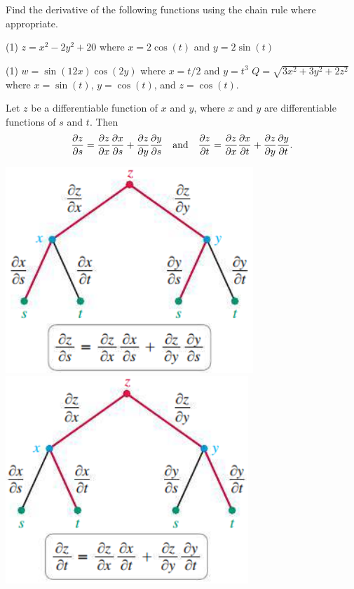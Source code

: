 \documentclass[mathNotesPreamble]{subfiles}
\begin{document}
  \begin{ex*}
    Find the derivative of the following functions using the chain rule where appropriate.
  \end{ex*}
  \begin{tasks}[after-item-skip=\stretch{1}, label=](1)
    \task $z=x^2-2y^2+20$ where $x=2\cos(t)$ and $y=2\sin(t)$
  \end{tasks}
  \pagebreak
  \begin{tasks}[after-item-skip=\stretch{1}, label=, resume](1)
    \task $w=\sin(12x)\cos(2y)$ where $x=t/2$ and $y=t^3$
    \task $Q=\sqrt{3x^2+3y^2+2z^2}$ where $x=\sin(t)$, $y=\cos(t)$, and $z=\cos(t)$.
  \end{tasks}
  \pagebreak

  \begin{thmBox*}
    Let $z$ be a differentiable function of $x$ and $y$, where $x$ and $y$ are differentiable functions of $s$ and $t$. Then
      \[\frac{\partial z}{\partial s}=\frac{\partial z}{\partial x}\frac{\partial x}{\partial s}+\frac{\partial z}{\partial y}\frac{\partial y}{\partial s} \quad\textnormal{and}\quad \frac{\partial z}{\partial t}=\frac{\partial z}{\partial x}\frac{\partial x}{\partial t}+\frac{\partial z}{\partial y}\frac{\partial y}{\partial t}.\]
  \end{thmBox*}

  \begin{center}
    \includegraphics[width=0.315\linewidth]{images/briggs_15_04/fig15_39}
    \includegraphics[width=0.315\linewidth, trim={0mm 1.0mm 0mm 0mm},clip]{images/briggs_15_04/fig15_40}
  \end{center}
\end{document}
